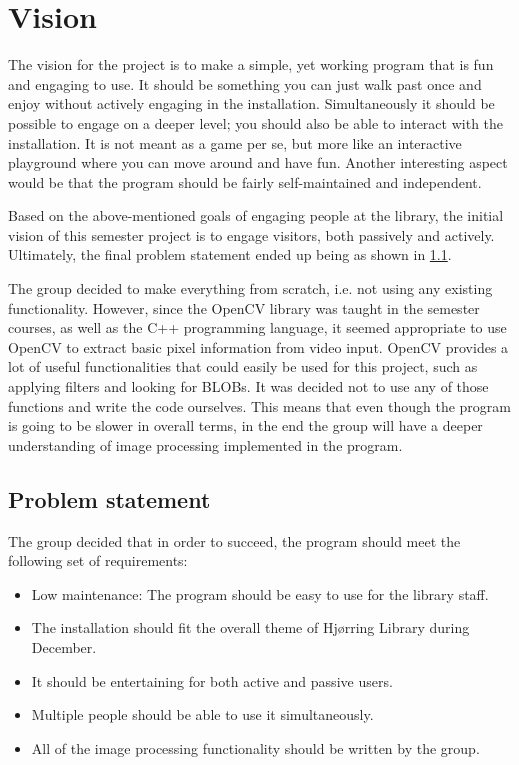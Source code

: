 \section{Vision}
The vision for the project is to make a simple, yet working program that is fun and engaging to use. It should be something you can just walk past once and enjoy without actively engaging in the installation. Simultaneously it should be possible to engage on a deeper level; you should also be able to interact with the installation. It is not meant as a game per se, but more like an interactive playground where you can move around and have fun. Another interesting aspect would be that the program should be fairly self-maintained and independent.

Based on the above-mentioned goals of engaging people at the library, the initial vision of this semester project is to engage visitors, both passively and actively. Ultimately, the final problem statement ended up being as shown in \ref{problemStatement}.

The group decided to make everything from scratch, i.e. not using any existing functionality. However, since the OpenCV library was taught in the semester courses, as well as the C++ programming language, it seemed appropriate to use OpenCV to extract basic pixel information from video input. OpenCV provides a lot of useful functionalities that could easily be used for this project, such as applying filters and looking for BLOBs. It was decided not to use any of those functions and write the code ourselves. This means that even though the program is going to be slower in overall terms, in the end the group will have a deeper understanding of image processing implemented in the program.

\subsection{Problem statement}\label{problemStatement}
The group decided that in order to succeed, the program should meet the following set of requirements:

\begin{itemize}
\item Low maintenance: The program should be easy to use for the library staff.
\item The installation should fit the overall theme of Hj{\o}rring Library during December.
\item It should be entertaining for both active and passive users.
\item Multiple people should be able to use it simultaneously.
\item All of the image processing functionality should be written by the group.
\end{itemize}
